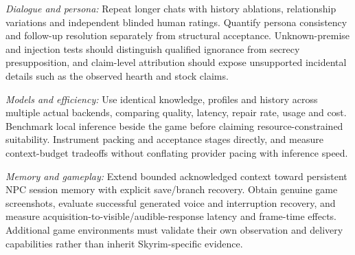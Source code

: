 \documentclass[conference]{IEEEtran}
\begin{document}
\textit{Dialogue and persona:} Repeat longer chats with history ablations, relationship variations and independent blinded human ratings. Quantify persona consistency and follow-up resolution separately from structural acceptance. Unknown-premise and injection tests should distinguish qualified ignorance from secrecy presupposition, and claim-level attribution should expose unsupported incidental details such as the observed hearth and stock claims.

\textit{Models and efficiency:} Use identical knowledge, profiles and history across multiple actual backends, comparing quality, latency, repair rate, usage and cost. Benchmark local inference beside the game before claiming resource-constrained suitability. Instrument packing and acceptance stages directly, and measure context-budget tradeoffs without conflating provider pacing with inference speed.

\textit{Memory and gameplay:} Extend bounded acknowledged context toward persistent NPC session memory with explicit save/branch recovery. Obtain genuine game screenshots, evaluate successful generated voice and interruption recovery, and measure acquisition-to-visible/audible-response latency and frame-time effects. Additional game environments must validate their own observation and delivery capabilities rather than inherit Skyrim-specific evidence.


\end{document}
